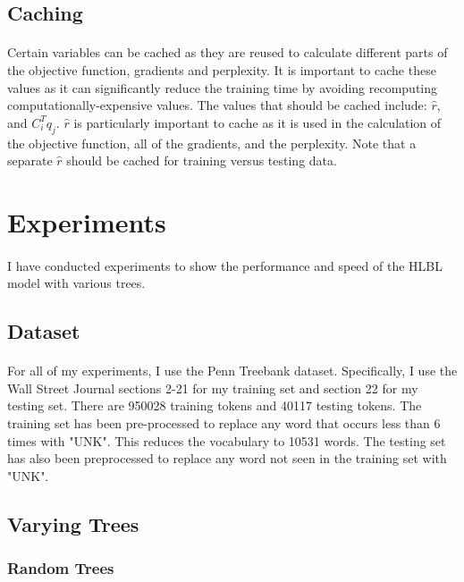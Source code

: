 \documentclass[12pt]{ociamthesis}  %
\begin{document}
\subsection{Caching}
\paragraph{}
Certain variables can be cached as they are reused to calculate different parts of the objective function, gradients and perplexity. It is important to cache these values as it can significantly reduce the training time by avoiding recomputing computationally-expensive values. The values that should be cached include: $\hat{r}$, and $C_i^T q_j$. $\hat{r}$ is particularly important to cache as it is used in the calculation of the objective function, all of the gradients, and the perplexity. Note that a separate $\hat{r}$ should be cached for training versus testing data.

\section{Experiments}
\paragraph{}
I have conducted experiments to show the performance and speed of the HLBL model with various trees.

\subsection{Dataset}
\paragraph{}
For all of my experiments, I use the Penn Treebank dataset. Specifically, I use the Wall Street Journal sections 2-21 for my training set and section 22 for my testing set. There are 950028 training tokens and 40117 testing tokens. The training set has been pre-processed to replace any word that occurs less than 6 times with "UNK". This reduces the vocabulary to 10531 words. The testing set has also been preprocessed to replace any word not seen in the training set with "UNK".

\subsection{Varying Trees}
\subsubsection{Random Trees}
\end{document}
